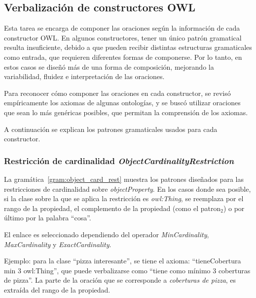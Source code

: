 \subsection{Verbalización de constructores OWL}
\label{sec:verbalizacion_constructores}
Esta tarea se encarga de componer las oraciones según la información de cada constructor OWL.
En algunos constructores, tener un único patrón gramatical resulta insuficiente, debido a que pueden recibir distintas estructuras gramaticales como entrada, que requieren diferentes formas de componerse. Por lo tanto, en estos casos se diseñó más de una forma de composición, mejorando la variabilidad, fluidez e interpretación de las oraciones. 

Para reconocer cómo componer las oraciones en cada constructor, se revisó empíricamente los axiomas de algunas ontologías, y se buscó utilizar oraciones que sean lo más genéricas posibles, que permitan la comprensión de los axiomas. 

A continuación se explican los patrones gramaticales usados para cada constructor. %

\subsubsection{Restricción de cardinalidad \emph{ObjectCardinalityRestriction}}

La gramática~\ref{gram:object_card_rest} muestra los patrones diseñados para las restricciones de cardinalidad sobre \emph{objectProperty}. En los casos donde sea posible, si la clase sobre la que se aplica la restricción es \emph{owl:Thing}, se reemplaza por el rango de la propiedad, el complemento de la propiedad (como el patron$_2$) o por último por la palabra ``cosa''.

El enlace es seleccionado dependiendo del operador \emph{MinCardinality}, \emph{MaxCardinality} y \emph{ExactCardinality}.

Ejemplo: para la clase ``pizza interesante'', se tiene el axioma: ``tieneCobertura min 3 owl:Thing'', que puede verbalizarse como ``tiene como mínimo 3 coberturas de pizza''. La parte de la oración que se corresponde a \emph{coberturas de pizza}, es extraída del rango de la propiedad.

